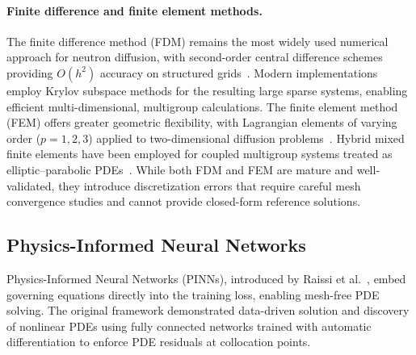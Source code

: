 \paragraph{Finite difference and finite element methods.}
The finite difference method (FDM) remains the most widely used numerical approach for neutron diffusion, with second-order central difference schemes providing $O(h^2)$ accuracy on structured grids~\cite{lee2020nuclear,kuridan2023neutron}.
Modern implementations employ Krylov subspace methods for the resulting large sparse systems, enabling efficient multi-dimensional, multigroup calculations.
The finite element method (FEM) offers greater geometric flexibility, with Lagrangian elements of varying order ($p=1,2,3$) applied to two-dimensional diffusion problems~\cite{davierwalla1977fem}.
Hybrid mixed finite elements have been employed for coupled multigroup systems treated as elliptic--parabolic PDEs~\cite{schmid1995fem}.
While both FDM and FEM are mature and well-validated, they introduce discretization errors that require careful mesh convergence studies and cannot provide closed-form reference solutions.

\subsection{Physics-Informed Neural Networks}
\label{sec:rw_pinn}

Physics-Informed Neural Networks (PINNs), introduced by Raissi et al.~\cite{raissi2019pinn}, embed governing equations directly into the training loss, enabling mesh-free PDE solving.
The original framework demonstrated data-driven solution and discovery of nonlinear PDEs using fully connected networks trained with automatic differentiation to enforce PDE residuals at collocation points.

